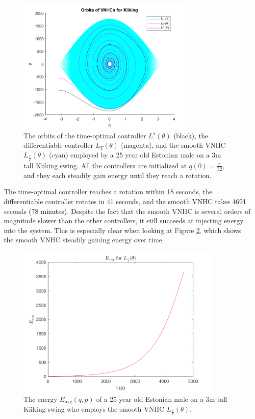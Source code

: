 \begin{figure}
   \centering
   \includegraphics[width=0.8\textwidth]{images/kiiking_orbits.png}
   \caption{The orbits of the time-optimal controller \(L^\star(\theta)\)
      (black), the differentiable controller \(L_T(\theta)\) (magenta),
      and the smooth VNHC \(L_\frac{\pi}{2}(\theta)\) (cyan) employed by a 25
      year old Estonian male on a 3m tall Kiiking swing. All the controllers are
      initialized at \(q(0) = \frac{\pi}{32}\), and they each steadily gain
      energy until they reach a rotation.}
   \label{fig:vlp-sim-orbit}
\end{figure}

The time-optimal controller reaches a rotation within 18 seconds, the
differentiable controller rotates in 41 seconds, and
the smooth VNHC takes 4691 seconds (78 minutes).
Despite the fact that the smooth VNHC is several orders of magnitude slower than
the other controllers, it still succeeds at injecting energy into the
system.
This is especially clear when looking at Figure \ref{fig:vlp-sim-energy}, which
shows the smooth VNHC steadily gaining energy over time.

\begin{figure}
   \centering
   \includegraphics[width=0.9\textwidth]{images/E_kiiking_ltheta.png}
   \caption{The energy \(E_\text{avg}(q,p)\) of a 25 year old Estonian male on a
      3m tall Kiiking swing who employs the smooth VNHC
   \(L_\frac{\pi}{2}(\theta)\).}
   \label{fig:vlp-sim-energy}
\end{figure}

